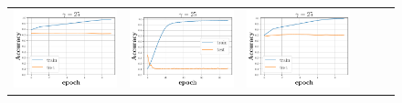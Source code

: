\begin{figure}[h]
\begin{minipage}{0.99\columnwidth}
{\begin{tabular}{cccccc}
\includegraphics[scale=0.125]{figs/galu_25_good.pdf}&
\includegraphics[scale=0.125]{figs/galu_25_bad.pdf}&
\includegraphics[scale=0.125]{figs/galu_25_bad_good.pdf}&

\end{tabular}}
\end{minipage}
\end{figure}
